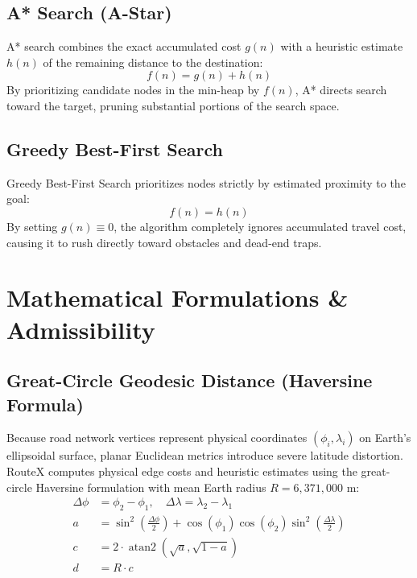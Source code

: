 \documentclass[conference]{IEEEtran}
\begin{document}
\subsection{A* Search (A-Star)}
A* search combines the exact accumulated cost $g(n)$ with a heuristic estimate $h(n)$ of the remaining distance to the destination:
\begin{equation}
f(n) = g(n) + h(n)
\label{eq:astar}
\end{equation}
By prioritizing candidate nodes in the min-heap by $f(n)$, A* directs search toward the target, pruning substantial portions of the search space.

\subsection{Greedy Best-First Search}
Greedy Best-First Search prioritizes nodes strictly by estimated proximity to the goal:
\begin{equation}
f(n) = h(n)
\label{eq:greedy}
\end{equation}
By setting $g(n) \equiv 0$, the algorithm completely ignores accumulated travel cost, causing it to rush directly toward obstacles and dead-end traps.

\section{Mathematical Formulations \& Admissibility}

\subsection{Great-Circle Geodesic Distance (Haversine Formula)}
Because road network vertices represent physical coordinates $(\phi_i, \lambda_i)$ on Earth's ellipsoidal surface, planar Euclidean metrics introduce severe latitude distortion. RouteX computes physical edge costs and heuristic estimates using the great-circle Haversine formulation with mean Earth radius $R = 6{,}371{,}000\text{ m}$:
\begin{align}
\Delta \phi &= \phi_2 - \phi_1, \quad \Delta \lambda = \lambda_2 - \lambda_1 \\
a &= \sin^2\left(\frac{\Delta \phi}{2}\right) + \cos(\phi_1)\cos(\phi_2)\sin^2\left(\frac{\Delta \lambda}{2}\right) \\
c &= 2 \cdot \operatorname{atan2}\left(\sqrt{a}, \sqrt{1 - a}\right) \\
d &= R \cdot c
\label{eq:haversine}
\end{align}
\end{document}
